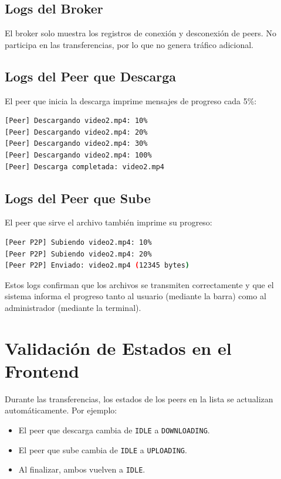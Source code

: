 \documentclass[12pt]{article}
\begin{document}
\subsection{Logs del Broker}
El broker solo muestra los registros de conexión y desconexión de peers. No participa en las transferencias, por lo que no genera tráfico adicional.

\subsection{Logs del Peer que Descarga}
El peer que inicia la descarga imprime mensajes de progreso cada 5\%:

\begin{lstlisting}[language=bash, caption=Logs del peer durante una descarga]
[Peer] Descargando video2.mp4: 10%
[Peer] Descargando video2.mp4: 20%
[Peer] Descargando video2.mp4: 30%
[Peer] Descargando video2.mp4: 100%
[Peer] Descarga completada: video2.mp4
\end{lstlisting}

\subsection{Logs del Peer que Sube}
El peer que sirve el archivo también imprime su progreso:

\begin{lstlisting}[language=bash, caption=Logs del peer que sube un archivo]
[Peer P2P] Subiendo video2.mp4: 10%
[Peer P2P] Subiendo video2.mp4: 20%
[Peer P2P] Enviado: video2.mp4 (12345 bytes)
\end{lstlisting}

Estos logs confirman que los archivos se transmiten correctamente y que el sistema informa el progreso tanto al usuario (mediante la barra) como al administrador (mediante la terminal).

\section{Validación de Estados en el Frontend}

Durante las transferencias, los estados de los peers en la lista se actualizan automáticamente. Por ejemplo:
\begin{itemize}
    \item El peer que descarga cambia de \texttt{IDLE} a \texttt{DOWNLOADING}.
    \item El peer que sube cambia de \texttt{IDLE} a \texttt{UPLOADING}.
    \item Al finalizar, ambos vuelven a \texttt{IDLE}.
\end{itemize}
\end{document}
